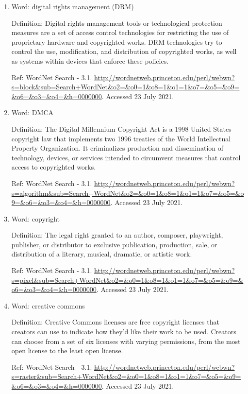 \documentclass{scrartcl}
\begin{document}
\begin{enumerate}
\item Word: digital rights management (DRM)

Definition: Digital rights management tools or technological protection measures are a set of access control technologies for restricting the use of proprietary hardware and copyrighted works. DRM technologies try to control the use, modification, and distribution of copyrighted works, as well as systems within devices that enforce these policies.

Ref: WordNet Search - 3.1. \url{http://wordnetweb.princeton.edu/perl/webwn?s=block\&sub=Search+WordNet\&o2=\&o0=1\&o8=1\&o1=1\&o7=\&o5=\&o9=\&o6=\&o3=\&o4=\&h=0000000}. Accessed 23 July 2021.

\item Word: DMCA

Definition:  The Digital Millennium Copyright Act is a 1998 United States copyright law that implements two 1996 treaties of the World Intellectual Property Organization. It criminalizes production and dissemination of technology, devices, or services intended to circumvent measures that control access to copyrighted works.

Ref: WordNet Search - 3.1. \url{http://wordnetweb.princeton.edu/perl/webwn?s=algorithm\&sub=Search+WordNet\&o2=\&o0=1\&o8=1\&o1=1\&o7=\&o5=\&o9=\&o6=\&o3=\&o4=\&h=0000000}. Accessed 23 July 2021.

\item Word: copyright

Definition: The legal right granted to an author, composer, playwright, publisher, or distributor to exclusive publication, production, sale, or distribution of a literary, musical, dramatic, or artistic work.

Ref: WordNet Search - 3.1. \url{http://wordnetweb.princeton.edu/perl/webwn?s=pixel\&sub=Search+WordNet\&o2=\&o0=1\&o8=1\&o1=1\&o7=\&o5=\&o9=\&o6=\&o3=\&o4=\&h=0000000}. Accessed 23 July 2021.

\item Word: creative commons

Definition: Creative Commons licenses are free copyright licenses that creators can use to indicate how they'd like their work to be used. Creators can choose from a set of six licenses with varying permissions, from the most open license to the least open license.

Ref: WordNet Search - 3.1. \url{http://wordnetweb.princeton.edu/perl/webwn?s=raster\&sub=Search+WordNet\&o2=\&o0=1\&o8=1\&o1=1\&o7=\&o5=\&o9=\&o6=\&o3=\&o4=\&h=0000000}. Accessed 23 July 2021.


\end{enumerate}
\end{document}
